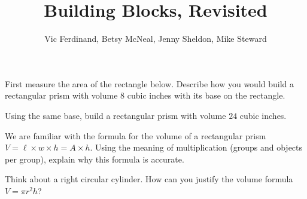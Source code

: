 \documentclass{ximera}
\title{Building Blocks, Revisited}
\author{Vic Ferdinand, Betsy McNeal, Jenny Sheldon, Mike Steward}
\begin{document}
\begin{abstract}
\end{abstract}
\maketitle




\begin{problem}
First measure the area of the rectangle below.  Describe how you would build a rectangular prism with volume $8$ cubic inches with its base on the rectangle.


\end{problem}

\begin{problem}
Using the same base, build a rectangular prism with volume $24$ cubic inches.

\end{problem}


\begin{problem}
We are familiar with the formula for the volume of a rectangular prism $V = \ell \times w \times h = A \times h$.  Using the meaning of multiplication (groups and objects per group), explain why this formula is accurate.


\end{problem}

\begin{problem} 
Think about a right circular cylinder.  How can you justify the volume formula $V = \pi r^2 h$?


\end{problem}

\newpage
\end{document}
